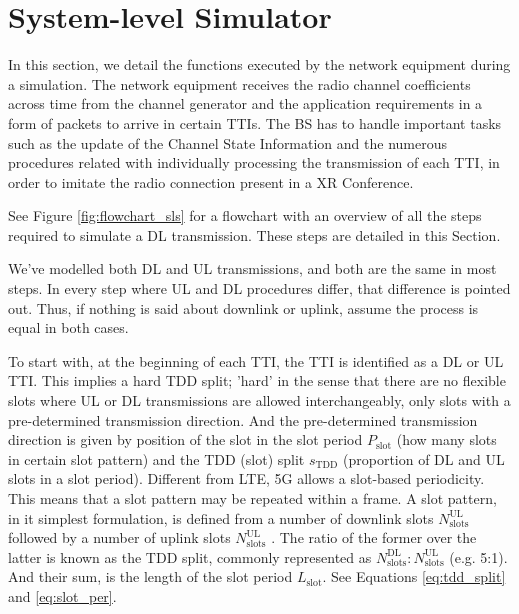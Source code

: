 \newpage
\section{System-level Simulator}
\label{sec:sls}

In this section, we detail the functions executed by the network equipment during a simulation. The network equipment  receives the radio channel coefficients across time from the channel generator and the application requirements in a form of packets to arrive in certain \acp{TTI}. The BS has to handle important tasks such as the update of the Channel State Information and the numerous procedures related with individually processing the transmission of each \ac{TTI}, in order to imitate the radio connection present in a XR Conference. 




See Figure \ref{fig:flowchart_sls} for a flowchart with an overview of all the steps required to simulate a DL transmission. These steps are detailed in this Section.


We've modelled both DL and UL transmissions, and both are the same in most steps. In every step where UL and DL procedures differ, that difference is pointed out. Thus, if nothing is said about downlink or uplink, assume the process is equal in both cases.


To start with, at the beginning of each TTI, the TTI is identified as a DL or UL TTI. This implies a hard TDD split; 'hard' in the sense that there are no flexible slots where UL or DL transmissions are allowed interchangeably, only slots with a pre-determined transmission direction. And the pre-determined transmission direction is given by position of the slot in the slot period $P_\text{slot}$ (how many slots in certain slot pattern) and the TDD (slot) split $s_\text{TDD}$ (proportion of DL and UL slots in a slot period). Different from LTE, 5G allows a slot-based periodicity. This means that a slot pattern may be repeated within a frame. A slot pattern, in it simplest formulation, is defined from a number of downlink slots $N^\text{UL}_\text{slots}$ followed by a number of uplink slots $N^\text{UL}_\text{slots}$ \cite{3gpp-slot_periodicity}. The ratio of the former over the latter is known as the TDD split, commonly represented as $N^\text{DL}_\text{slots} : N^\text{UL}_\text{slots}$ (e.g. 5:1). And their sum, is the length of the slot period $L_\text{slot}$. See Equations \eqref{eq:tdd_split} and \eqref{eq:slot_per}.

